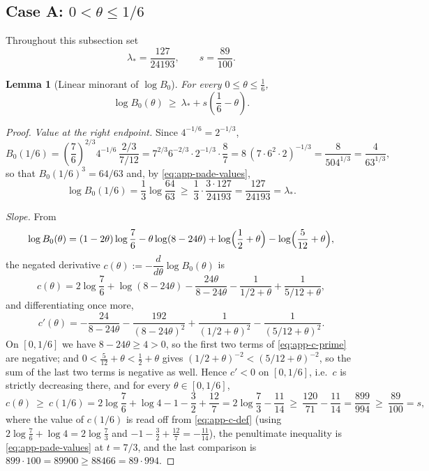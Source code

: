 \documentclass[11pt]{article}
\newtheorem{lemma}[theorem]{Lemma}
\theoremstyle{remark}
\theoremstyle{plain}
\theoremstyle{plain}
\begin{document}
\subsection*{Case A: $0<\theta\le1/6$}

Throughout this subsection set
\[
        \lambda_*=\frac{127}{24193},
        \qquad
        s=\frac{89}{100}.
\]

\begin{lemma}[Linear minorant of $\log B_0$]\label{lem:app-B0-linear}
For every $0\le\theta\le\frac16$,
\[
        \log B_0(\theta)\ \ge\ \lambda_*+s\left(\frac16-\theta\right).
\]
\end{lemma}

\begin{proof}
\emph{Value at the right endpoint.}
Since $4^{-1/6}=2^{-1/3}$,
\[
        B_0(1/6)
        =\left(\frac76\right)^{2/3}4^{-1/6}\,\frac{2/3}{7/12}
        =7^{2/3}6^{-2/3}\cdot2^{-1/3}\cdot\frac{8}{7}
        =8\,(7\cdot6^2\cdot2)^{-1/3}
        =\frac{8}{504^{1/3}}
        =\frac{4}{63^{1/3}},
\]
so that $B_0(1/6)^3=64/63$ and, by \eqref{eq:app-pade-values},
\begin{equation}\label{eq:app-lam-star}
        \log B_0(1/6)=\frac13\log\frac{64}{63}
        \ \ge\ \frac13\cdot\frac{3\cdot127}{24193}
        =\frac{127}{24193}=\lambda_* .
\end{equation}

\emph{Slope.}  From
\[
        \log B_0(\theta)
        =(1-2\theta)\log\frac76-\theta\log(8-24\theta)
        +\log\Bigl(\frac12+\theta\Bigr)-\log\Bigl(\frac5{12}+\theta\Bigr),
\]
the negated derivative $c(\theta):=-\dfrac{d}{d\theta}\log B_0(\theta)$ is
\begin{equation}\label{eq:app-c-def}
        c(\theta)
        =2\log\frac76+\log(8-24\theta)-\frac{24\theta}{8-24\theta}
        -\frac{1}{1/2+\theta}+\frac{1}{5/12+\theta},
\end{equation}
and differentiating once more,
\begin{equation}\label{eq:app-c-prime}
        c'(\theta)
        =-\frac{24}{8-24\theta}-\frac{192}{(8-24\theta)^2}
        +\frac{1}{(1/2+\theta)^2}-\frac{1}{(5/12+\theta)^2}.
\end{equation}
On $[0,1/6]$ we have $8-24\theta\ge4>0$, so the first two terms of
\eqref{eq:app-c-prime} are negative; and $0<\frac5{12}+\theta<\frac12+\theta$
gives $(1/2+\theta)^{-2}<(5/12+\theta)^{-2}$, so the sum of the last two
terms is negative as well.  Hence $c'<0$ on $[0,1/6]$, i.e.\ $c$ is strictly
decreasing there, and for every $\theta\in[0,1/6]$,
\begin{equation}\label{eq:app-c-lb}
        c(\theta)\ \ge\ c(1/6)
        =2\log\frac76+\log4-1-\frac32+\frac{12}7
        =2\log\frac73-\frac{11}{14}
        \ \ge\ \frac{120}{71}-\frac{11}{14}
        =\frac{899}{994}
        \ \ge\ \frac{89}{100}=s,
\end{equation}
where the value of $c(1/6)$ is read off from \eqref{eq:app-c-def} (using
$2\log\frac76+\log4=2\log\frac73$ and $-1-\frac32+\frac{12}7=-\frac{11}{14}$),
the penultimate inequality is \eqref{eq:app-pade-values} at $t=7/3$, and the
last comparison is $899\cdot100=89900\ge88466=89\cdot994$.


\end{proof}
\end{document}

